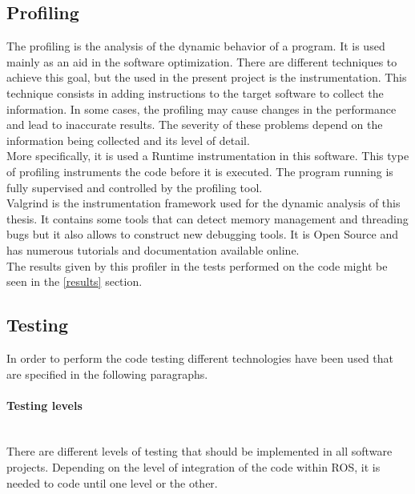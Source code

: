 	\subsection{Profiling}
		\label{profiling}
		The profiling is the analysis of the dynamic behavior of a program. It is used mainly as an aid in the software optimization. There are different techniques to achieve this goal, but the used in the present project is the instrumentation. This technique consists in adding instructions to the target software to collect the information. In some cases, the profiling may cause changes in the performance and lead to inaccurate results. The severity of these problems depend on the information being collected and its level of detail. 
		\\

		More specifically, it is used a Runtime instrumentation in this software. This type of profiling instruments the code before it is executed. The program running is fully supervised and controlled by the profiling tool. 
		\\

		Valgrind \cite{valgrind} is the instrumentation framework used for the dynamic analysis of this thesis. It contains some tools that can detect memory management and threading bugs but it also allows to construct new debugging tools. It is Open Source and has numerous tutorials and documentation available online. \\

		The results given by this profiler in the tests performed on the code might be seen in the \ref{results} section. 


	\subsection{Testing}
		\label{technologies_testing}
		In order to perform the code testing different technologies have been used that are specified in the following paragraphs. 
		\\


		\paragraph {Testing levels}\mbox{} \\

		There are different levels of testing that should be implemented in all software projects. Depending on the level of integration of the code within ROS, it is needed to code until one level or the other. 		\\

